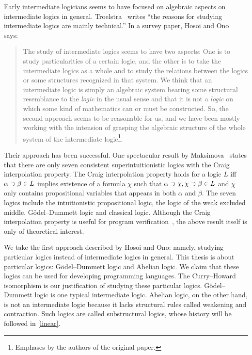 Early intermediate logicians seems to have focused on algebraic aspects
on intermediate logics in general.
Troelstra~\cite[p.~223]{goedelcollected} writes ``the reasons
for studying intermediate logics are mainly technical.''
In a survey paper, Hosoi and Ono~\cite{hosoi-ono} says:
 \begin{quote}
  The study of intermediate logics seems to have two aspects: One is to
  study particularities of a certain logic, and the other is to take the
  intermediate logics as a whole and to study the relations between the
  logics or some structures recognized in that system.  We think that an
  intermediate logic is simply an algebraic system bearing some
  structural resemblance to the \textit{logic} in the usual sense and
  that it is not a \textit{logic} on which some kind of mathematics can
  or must be constructed.  So, the second approach seems to be
  reasonable for us, and we have been mostly working with the intension
  of grasping the algebraic structure of the whole system of the
  intermediate logic\footnote{Emphases by the authors of the original
  paper.}.
 \end{quote}
Their approach has been successful.
One spectacular result by Maksimova~\citep{maksimova77}
states that there are only seven consistent
superintuitionistic logics with the Craig interpolation
property.
The Craig interpolation property holds for a logic $L$ iff $\alpha
\supset\beta\in L$ implies existence of a formula $\chi$ such that
$\alpha\supset\chi, \chi\supset\beta\in L$ and $\chi$ only contains propositional
variables that appears in both $\alpha$ and $\beta$.
The seven logics include the intuitionistic propositional logic, the logic of
the weak excluded middle,
G\"odel--Dummett logic
and classical logic.
Although the Craig interpolation property is useful for program
verification~\citep{mcmillan2003,esparza,unno2009},
the above result itself is only of
theoretical interest.

We take the first approach described by Hosoi and Ono: namely,
studying particular logics instead of intermediate logics in general.
This thesis is about particular logics: G\"odel--Dummett logic and
Abelian logic.  We claim that these logics can be used for developing
 programming languages.  The Curry--Howard
isomorphism is our justification of studying these particular logics.
G\"odel--Dummett logic is one typical intermediate logic.
Abelian logic, on the other hand, is not an intermediate logic
because it lacks structural rules called weakening and contraction.  Such logics are
called substructural logics, whose history will be followed in \ref{linear}.

